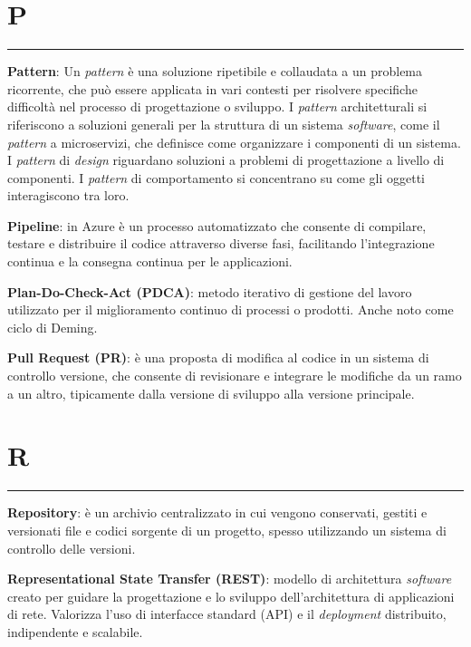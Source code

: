 \section*{P}
{\color{lightgray}\rule{\textwidth}{0.4pt}} %
\begin{glossaryitemize}
    \item \textbf{Pattern}: Un \textit{pattern} è una soluzione ripetibile e collaudata a un problema ricorrente, che può essere applicata in vari contesti per risolvere specifiche difficoltà nel processo di progettazione o sviluppo.  I \textit{pattern} architetturali si riferiscono a soluzioni generali per la struttura di un sistema \textit{software}, come il \textit{pattern} a microservizi, che definisce come organizzare i componenti di un sistema. I \textit{pattern} di \textit{design} riguardano soluzioni a problemi di progettazione a livello di componenti. I \textit{pattern} di comportamento si concentrano su come gli oggetti interagiscono tra loro.
    \item \textbf{Pipeline}: in Azure è un processo automatizzato che consente di compilare, testare e distribuire il codice attraverso diverse fasi, facilitando l'integrazione continua e la consegna continua per le applicazioni.
    \item \textbf{Plan-Do-Check-Act (PDCA)}: metodo iterativo di gestione del lavoro utilizzato per il miglioramento continuo di processi o prodotti. Anche noto come ciclo di Deming.
    \item \textbf{Pull Request (PR)}: è una proposta di modifica al codice in un sistema di controllo versione, che consente di revisionare e integrare le modifiche da un ramo a un altro, tipicamente dalla versione di sviluppo alla versione principale.
\end{glossaryitemize}

\section*{R}
{\color{lightgray}\rule{\textwidth}{0.4pt}} %
\begin{glossaryitemize}
    \item \textbf{Repository}: è un archivio centralizzato in cui vengono conservati, gestiti e versionati file e codici sorgente di un progetto, spesso utilizzando un sistema di controllo delle versioni.
    \item \textbf{Representational State Transfer (REST)}: modello di architettura \textit{software} creato per guidare la progettazione e lo sviluppo dell’architettura di applicazioni di rete. Valorizza l’uso di interfacce standard (API) e il \textit{deployment} distribuito, indipendente e scalabile.
\end{glossaryitemize}


